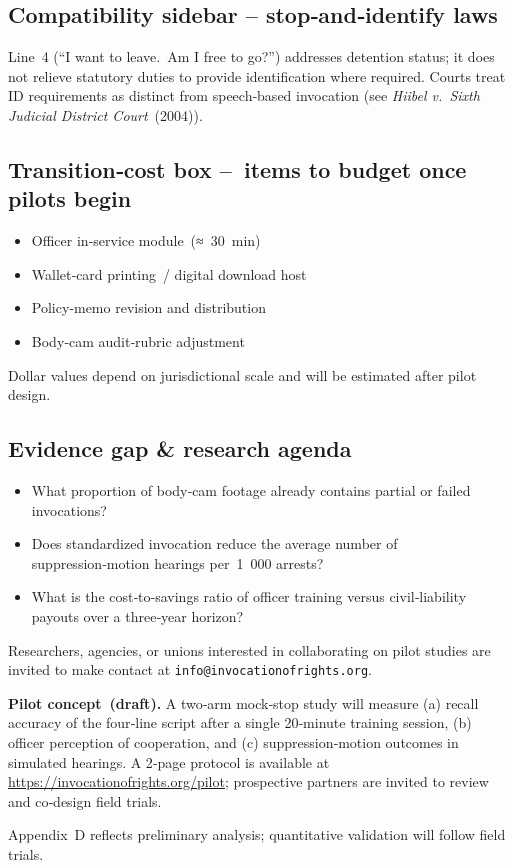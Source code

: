 \subsection*{Compatibility sidebar – stop‑and‑identify laws}

Line 4 (“I want to leave. Am I free to go?”) addresses detention status; it does not relieve statutory duties to provide identification where required. Courts treat ID requirements as distinct from speech‑based invocation (see \textit{Hiibel v.\ Sixth Judicial District Court} (2004)).

\subsection*{Transition‑cost box – items to budget once pilots begin}

\begin{itemize}\setlength\itemsep{2pt}
  \item Officer in‑service module (≈ 30 min)
  \item Wallet‑card printing / digital download host
  \item Policy‑memo revision and distribution
  \item Body‑cam audit‑rubric adjustment
\end{itemize}

Dollar values depend on jurisdictional scale and will be estimated after pilot design.

\subsection*{Evidence gap \& research agenda}

\begin{itemize}\setlength\itemsep{2pt}
  \item What proportion of body‑cam footage already contains partial or failed invocations?
  \item Does standardized invocation reduce the average number of suppression‑motion hearings per 1 000 arrests?
  \item What is the cost‑to‑savings ratio of officer training versus civil‑liability payouts over a three‑year horizon?
\end{itemize}

Researchers, agencies, or unions interested in collaborating on pilot studies are invited to make contact at \texttt{info@invocationofrights.org}.

\medskip
\noindent\textbf{Pilot concept (draft).} A two‑arm mock‑stop study will measure (a) recall accuracy of the four‑line script after a single 20‑minute training session, (b) officer perception of cooperation, and (c) suppression‑motion outcomes in simulated hearings. A 2‑page protocol is available at \url{https://invocationofrights.org/pilot}; prospective partners are invited to review and co‑design field trials.

\medskip
\noindent Appendix D reflects preliminary analysis; quantitative validation will follow field trials.

